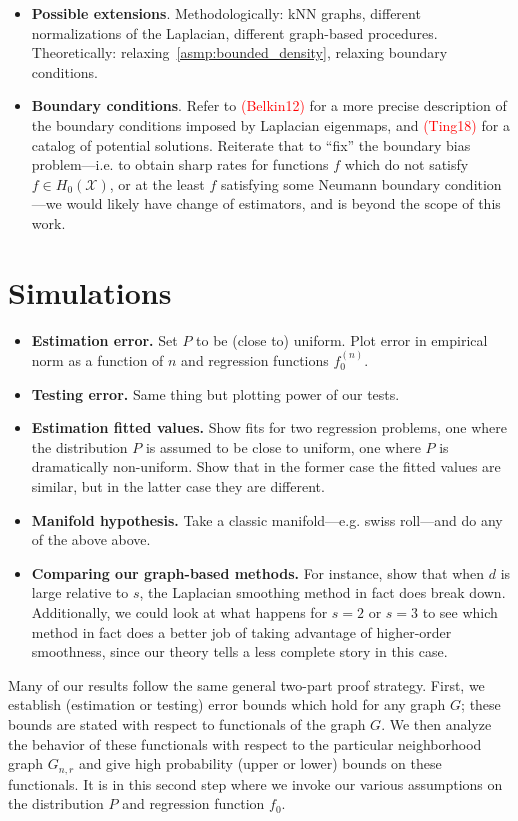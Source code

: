 \documentclass{article}
\newcommand{\1}{\mathbf{1}}
\newcommand{\Xset}{\mathcal{X}}
\theoremstyle{alden}
\theoremstyle{aldenthm}
\theoremstyle{definition}
\theoremstyle{remark}
\begin{document}
\begin{itemize}
	\item \textbf{Possible extensions}. Methodologically: kNN graphs, different normalizations of the Laplacian, different graph-based procedures. Theoretically: relaxing~\ref{asmp:bounded_density}, relaxing boundary conditions.
	\item \textbf{Boundary conditions}. Refer to \textcolor{red}{(Belkin12)} for a more precise description of the boundary conditions imposed by Laplacian eigenmaps, and \textcolor{red}{(Ting18)} for a catalog of potential solutions. Reiterate that to ``fix'' the boundary bias problem---i.e. to obtain sharp rates for functions $f$ which do not satisfy $f \in H_0(\Xset)$, or at the least $f$ satisfying some Neumann boundary condition---we would likely have change of estimators, and is beyond the scope of this work.
\end{itemize}

\section{Simulations}
\begin{itemize}
	\item \textbf{Estimation error.} Set $P$ to be (close to) uniform. Plot error in empirical norm as a function of $n$ and regression functions $f_0^{(n)}$.
	\item \textbf{Testing error.} Same thing but plotting power of our tests.
	\item \textbf{Estimation fitted values.} Show fits for two regression problems, one where the distribution $P$ is assumed to be close to uniform, one where $P$ is dramatically non-uniform. Show that in the former case the fitted values are similar, but in the latter case they are different.
	\item \textbf{Manifold hypothesis.} Take a classic manifold---e.g. swiss roll---and do any of the above above.
	\item \textbf{Comparing our graph-based methods.} For instance, show that when $d$ is large relative to $s$, the Laplacian smoothing method in fact does break down. Additionally, we could look at what happens for $s = 2$ or $s = 3$ to see which method in fact does a better job of taking advantage of higher-order smoothness, since our theory tells a less complete story in this case. 
\end{itemize}

\clearpage

\appendix

Many of our results follow the same general two-part proof strategy. First, we establish (estimation or testing) error bounds which hold for any graph $G$; these bounds are stated with respect to functionals of the graph $G$. We then analyze the behavior of these functionals with respect to the particular neighborhood graph $G_{n,r}$ and give high probability (upper or lower) bounds on these functionals. It is in this second step where we invoke our various assumptions on the distribution $P$ and regression function $f_0$.
\end{document}
